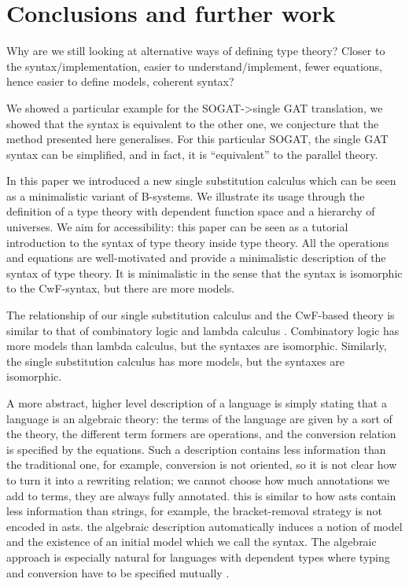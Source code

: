 \documentclass[sigplan,10pt,anonymous,review]{acmart}\settopmatter{printfolios=true,printccs=false,printacmref=false}
\begin{document}
\section{Conclusions and further work}
\label{sec:conclusion}

Why are we still looking at alternative ways of defining type theory?
Closer to the syntax/implementation, easier to understand/implement,
fewer equations, hence easier to define models, coherent syntax?

We showed a particular example for the SOGAT->single GAT translation,
we showed that the syntax is equivalent to the other one, we
conjecture that the method presented here generalises. For this
particular SOGAT, the single GAT syntax can be simplified, and in
fact, it is ``equivalent'' to the parallel theory.

In this paper we introduced a new single substitution calculus which
can be seen as a minimalistic variant of B-systems. We illustrate its
usage through the definition of a type theory with dependent function
space and a hierarchy of universes. We aim for accessibility: this
paper can be seen as a tutorial introduction to the syntax of type
theory inside type theory. All the operations and equations are
well-motivated and provide a minimalistic description of the syntax of
type theory. It is minimalistic in the sense that the syntax is
isomorphic to the CwF-syntax, but there are more models. 

The relationship of our single substitution calculus and the CwF-based
theory is similar to that of combinatory logic and lambda calculus
\cite{DBLP:conf/fscd/AltenkirchKSV23}. Combinatory logic has more
models than lambda calculus, but the syntaxes are
isomorphic. Similarly, the single substitution calculus has more
models, but the syntaxes are isomorphic.

A more abstract, higher level description of a language is simply
stating that a language is an algebraic theory: the terms of the
language are given by a sort of the theory, the different term formers
are operations, and the conversion relation is specified by the
equations. Such a description contains less information than the
traditional one, for example, conversion is not oriented, so it is not
clear how to turn it into a rewriting relation; we cannot choose how
much annotations we add to terms, they are always fully
annotated. this is similar to how asts contain less information than
strings, for example, the bracket-removal strategy is not encoded in
asts. the algebraic description automatically induces a notion of
model and the existence of an initial model
\cite{DBLP:journals/pacmpl/KaposiKA19} which we call the syntax. The
algebraic approach is especially natural for languages with dependent
types where typing and conversion have to be specified mutually
\cite{DBLP:conf/popl/AltenkirchK16}.
\end{document}
